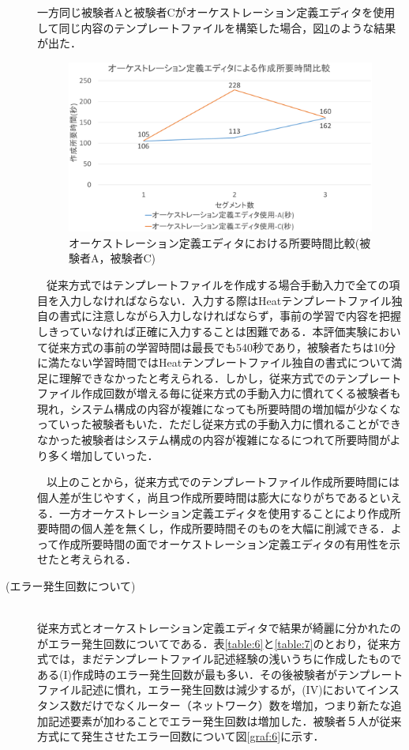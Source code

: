 \documentclass[mingoth]{kut-paper}		%
\begin{document}
\begin{description}
		一方同じ被験者Aと被験者Cがオーケストレーション定義エディタを使用して同じ内容のテンプレートファイルを構築した場合，図\ref{graf:5}のような結果が出た．
			
		\begin{figure}[H]
			\begin{center}
				\includegraphics[scale=0.45]{Document/EditorComparisonAC.eps}
				\caption{オーケストレーション定義エディタにおける所要時間比較(被験者A，被験者C)}
				\label{graf:5}
			\end{center}
		\end{figure}
		\texttt 　従来方式ではテンプレートファイルを作成する場合手動入力で全ての項目を入力しなければならない．入力する際はHeatテンプレートファイル独自の書式に注意しながら入力しなければならず，事前の学習で内容を把握しきっていなければ正確に入力することは困難である．本評価実験において従来方式の事前の学習時間は最長でも540秒であり，被験者たちは10分に満たない学習時間ではHeatテンプレートファイル独自の書式について満足に理解できなかったと考えられる．しかし，従来方式でのテンプレートファイル作成回数が増える毎に従来方式の手動入力に慣れてくる被験者も現れ，システム構成の内容が複雑になっても所要時間の増加幅が少なくなっていった被験者もいた．ただし従来方式の手動入力に慣れることができなかった被験者はシステム構成の内容が複雑になるにつれて所要時間がより多く増加していった．
			
		\texttt  　以上のことから，従来方式でのテンプレートファイル作成所要時間には個人差が生じやすく，尚且つ作成所要時間は膨大になりがちであるといえる．一方オーケストレーション定義エディタを使用することにより作成所要時間の個人差を無くし，作成所要時間そのものを大幅に削減できる．よって作成所要時間の面でオーケストレーション定義エディタの有用性を示せたと考えられる．
		
		\item[(エラー発生回数について)]\mbox{}\\
		従来方式とオーケストレーション定義エディタで結果が綺麗に分かれたのがエラー発生回数についてである．表\ref{table:6}と\ref{table:7}のとおり，従来方式では，まだテンプレートファイル記述経験の浅いうちに作成したものである(I)作成時のエラー発生回数が最も多い．その後被験者がテンプレートファイル記述に慣れ，エラー発生回数は減少するが，(I\hspace{-1pt}V)においてインスタンス数だけでなくルーター（ネットワーク）数を増加，つまり新たな追加記述要素が加わることでエラー発生回数は増加した．被験者５人が従来方式にて発生させたエラー回数について図\ref{graf:6}に示す．
		

\end{description}
\end{document}
